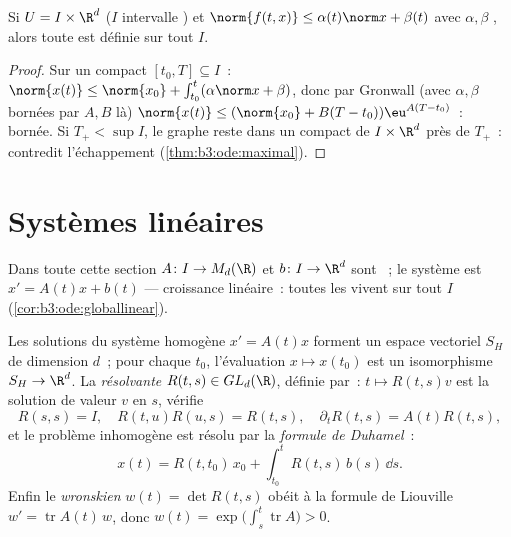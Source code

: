 \begin{corollary}
\label{cor:b3:ode:globallinear}
Si $U = I\times\R^d$ ($I$ intervalle ) et
$\norm{f(t, x)} \leq \alpha(t)\norm x + \beta(t)$ avec
$\alpha, \beta$ , alors toute  est
définie sur tout $I$.
\end{corollary}

\begin{proof}
Sur un compact $[t_0, T] \subseteq I$~:
$\norm{x(t)} \leq \norm{x_0} + \int_{t_0}^t(\alpha\norm x +
\beta)$, donc par Gronwall (avec $\alpha, \beta$ bornées par
$A, B$ là) $\norm{x(t)} \leq (\norm{x_0} + B(T -
t_0))\eu^{A(T - t_0)}$~: bornée. Si $T_+ < \sup I$, le graphe
reste dans un compact de $I\times\R^d$ près de $T_+$~:
contredit l'échappement (\cref{thm:b3:ode:maximal}).
\end{proof}

\section{Systèmes linéaires}

Dans toute cette section $A \colon I \to M_d(\R)$ et
$b \colon I \to \R^d$ sont ~; le système est
$x' = A(t)x + b(t)$ --- croissance linéaire~: toutes les
 vivent sur tout $I$
(\cref{cor:b3:ode:globallinear}).

\begin{theorem}[Structure]\label{thm:b3:ode:linearstructure}
Les solutions du système homogène $x' = A(t)x$ forment un
espace vectoriel $S_H$ de dimension $d$~; pour chaque $t_0$,
l'évaluation $x \mapsto x(t_0)$ est un isomorphisme
$S_H \to \R^d$. La \emph{résolvante} $R(t, s) \in GL_d(\R)$, définie par~:
$t \mapsto R(t, s)v$ est la solution de valeur $v$ en $s$,
vérifie
\[
R(s,s) = I,\quad R(t, u)R(u, s) = R(t, s),\quad
\partial_tR(t,s) = A(t)R(t,s),
\]
et le problème inhomogène est résolu par la \emph{formule de
Duhamel}~:
\[
x(t) = R(t, t_0)\,x_0 + \int_{t_0}^{t}R(t, s)\,b(s)\,\dd s .
\]
Enfin le \emph{wronskien} $w(t) = \det
R(t, s)$ obéit à la formule de Liouville $w' =
\operatorname{tr}A(t)\,w$, donc $w(t) =
\exp\bigl(\int_s^t\operatorname{tr}A\bigr) > 0$.
\end{theorem}

